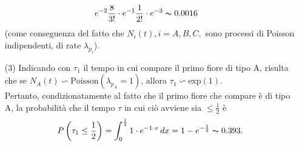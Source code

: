 \documentclass[12pt]{homework}
\begin{document}
\begin{enumerate}
\begin{align*}
    &e^{-2}\frac{8}{3!}\cdot e^{-1}\frac{1}{2!}\cdot e^{-3}\thicksim 0.0016  
  \end{align*} 
  (come conseguenza del fatto che $N_{i}\left(t\right), i=A, B, C,$ sono processi di Poisson indipendenti, di rate $\lambda_{p_{i}}$).
     \item[(3)]
     Indicando con $\tau_{1}$ il tempo in cui compare il primo fiore di tipo A, risulta che se $N_{A}\left(t\right)\backsim \text{Poisson}\left(\lambda_{p_{A}}=1\right)$, allora $\tau_{1}\backsim \text{exp}\left(1\right)$.\\
     Pertanto, condizionatamente al fatto che il primo fiore che compare è di tipo A, la probabilità che il tempo $\tau$ in cui ciò avviene sia $\leq \frac{1}{2}$ è
     \begin{equation*}
     P\left(\tau_{1}\leq \frac{1}{2}\right)=\int_{0}^{\frac{1}{2}}1\cdot e^{-1\cdot x} \,dx =1-e^{-\frac{1}{2}}\thicksim 0.393.
     \end{equation*}
     
  
    

  \end{enumerate}

  \newpage
\end{document}
